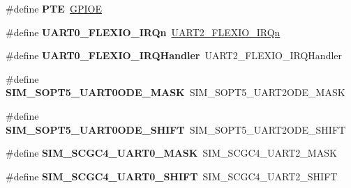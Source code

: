 \begin{DoxyCompactItemize}
\#define {\bfseries P\+TE}~\mbox{\hyperlink{group___g_p_i_o___peripheral___access___layer_gae04bdb5e8acc47cab1d0532e6b0d0763}{G\+P\+I\+OE}}
\item 
\mbox{\label{group___s_d_k___compatibility___symbols_ga0a87df16d0d2ae08a671e0f88bcebd9a}} 
\#define {\bfseries U\+A\+R\+T0\+\_\+\+F\+L\+E\+X\+I\+O\+\_\+\+I\+R\+Qn}~\mbox{\hyperlink{group___interrupt__vector__numbers_gga666eb0caeb12ec0e281415592ae89083a5475321bd2bac9aae86ed45895c66b1f}{U\+A\+R\+T2\+\_\+\+F\+L\+E\+X\+I\+O\+\_\+\+I\+R\+Qn}}
\item 
\mbox{\label{group___s_d_k___compatibility___symbols_ga85e93c1fd65e2865b25d5a7ebe5e933e}} 
\#define {\bfseries U\+A\+R\+T0\+\_\+\+F\+L\+E\+X\+I\+O\+\_\+\+I\+R\+Q\+Handler}~U\+A\+R\+T2\+\_\+\+F\+L\+E\+X\+I\+O\+\_\+\+I\+R\+Q\+Handler
\item 
\mbox{\label{group___s_d_k___compatibility___symbols_ga85d9af0e8b110779992162a6820b5358}} 
\#define {\bfseries S\+I\+M\+\_\+\+S\+O\+P\+T5\+\_\+\+U\+A\+R\+T0\+O\+D\+E\+\_\+\+M\+A\+SK}~S\+I\+M\+\_\+\+S\+O\+P\+T5\+\_\+\+U\+A\+R\+T2\+O\+D\+E\+\_\+\+M\+A\+SK
\item 
\mbox{\label{group___s_d_k___compatibility___symbols_gaa972dcd4d7e6d7a72e9da197afd19f03}} 
\#define {\bfseries S\+I\+M\+\_\+\+S\+O\+P\+T5\+\_\+\+U\+A\+R\+T0\+O\+D\+E\+\_\+\+S\+H\+I\+FT}~S\+I\+M\+\_\+\+S\+O\+P\+T5\+\_\+\+U\+A\+R\+T2\+O\+D\+E\+\_\+\+S\+H\+I\+FT
\item 
\mbox{\label{group___s_d_k___compatibility___symbols_ga8fc8faeefc38393c83454ceba120d5df}} 
\#define {\bfseries S\+I\+M\+\_\+\+S\+C\+G\+C4\+\_\+\+U\+A\+R\+T0\+\_\+\+M\+A\+SK}~S\+I\+M\+\_\+\+S\+C\+G\+C4\+\_\+\+U\+A\+R\+T2\+\_\+\+M\+A\+SK
\item 
\mbox{\label{group___s_d_k___compatibility___symbols_gae3407d4e1676ac6654898712335842b0}} 
\#define {\bfseries S\+I\+M\+\_\+\+S\+C\+G\+C4\+\_\+\+U\+A\+R\+T0\+\_\+\+S\+H\+I\+FT}~S\+I\+M\+\_\+\+S\+C\+G\+C4\+\_\+\+U\+A\+R\+T2\+\_\+\+S\+H\+I\+FT
\item 
\mbox{\label{group___s_d_k___compatibility___symbols_ga7a07348b4332ff6b88abf6092347deba}} 

\end{DoxyCompactItemize}
